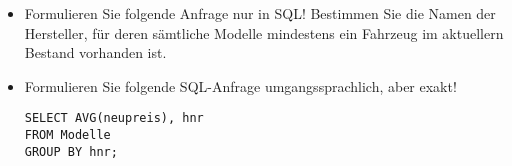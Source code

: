 \documentclass{bschlangaul-aufgabe}
\begin{document}
\begin{itemize}
\begin{enumerate}
\end{enumerate}

%

\item Formulieren Sie folgende Anfrage nur in SQL! Bestimmen Sie die
Namen der Hersteller, für deren sämtliche Modelle mindestens ein
Fahrzeug im aktuellern Bestand vorhanden ist.

%

\item Formulieren Sie folgende SQL-Anfrage umgangssprachlich, aber
exakt!

\begin{verbatim}
SELECT AVG(neupreis), hnr
FROM Modelle
GROUP BY hnr;
\end{verbatim}

\end{itemize}
\end{document}
